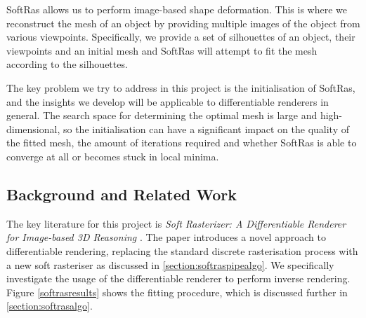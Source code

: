 \documentclass{article}
\begin{document}
SoftRas allows us to perform image-based shape deformation. This is where we reconstruct the mesh of an object by providing multiple images of the object from various viewpoints. Specifically, we provide a set of silhouettes of an object, their viewpoints and an initial mesh and SoftRas will attempt to fit the mesh according to the silhouettes.

The key problem we try to address in this project is the initialisation of SoftRas, and the insights we develop will be applicable to differentiable renderers in general. The search space for determining the optimal mesh is large and high-dimensional, so the initialisation can have a significant impact on the quality of the fitted mesh, the amount of iterations required and whether SoftRas is able to converge at all or becomes stuck in local minima.

\newpage
\subsection{Background and Related Work}

The key literature for this project is \emph{Soft Rasterizer: A Differentiable Renderer for Image-based 3D Reasoning} \parencite{softras}. The paper introduces a novel approach to differentiable rendering, replacing the standard discrete rasterisation process with a new soft rasteriser as discussed in \ref{section:softraspipealgo}. We specifically investigate the usage of the differentiable renderer to perform inverse rendering. Figure \ref{softrasresults} shows the fitting procedure, which is discussed further in \ref{section:softrasalgo}.
\end{document}
